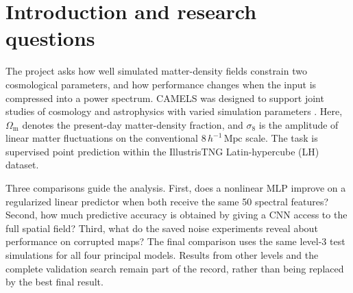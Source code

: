 \documentclass[11pt,a4paper]{article}
\newcommand{\Om}{\Omega_{\mathrm m}}
\newcommand{\sig}{\sigma_8}
\begin{document}
\begin{abstract}
We study supervised estimation of the matter-density parameter $\Om$ and fluctuation-amplitude parameter $\sig$ from CAMELS IllustrisTNG total-matter maps at redshift zero. The project compares Ridge regression and a multilayer perceptron (MLP) on 50-bin projected power spectra with convolutional neural networks (CNNs) on full $256\times256$ density maps. Simulation-level partitioning keeps each simulation's 15 related maps together across training, validation, and test groups. The three disjoint dataset levels contain 67, 333, and 600 simulations. Ridge and MLP tests show moderate gains over a training-mean baseline, with weak small-sample performance for $\sig$. On the level-3 held-out test set of 120 simulations and 1,800 maps, the 10-step CNN obtains map RMSE $(0.0211,0.0304)$ and the 16-step CNN obtains $(0.0192,0.0324)$ for $(\Om,\sig)$. Averaging predictions within each simulation improves these errors further, though the two CNNs retain different strengths. Saved Gaussian-noise experiments show larger group-average errors at noise strength 0.05 than at 0.01. Because those experiments use corrupted training and test inputs, different shortlisted models, and validation-selected checkpoints, they do not establish the benefit of training-time augmentation on clean data. Complete score tables, all saved figures, and a source manifest accompany this report.
\end{abstract}

\begingroup
\small\setlength{\parskip}{0pt}
\tableofcontents
\endgroup
\clearpage

\section{Introduction and research questions}
The project asks how well simulated matter-density fields constrain two cosmological parameters, and how performance changes when the input is compressed into a power spectrum. CAMELS was designed to support joint studies of cosmology and astrophysics with varied simulation parameters \cite{camels,cmd}. Here, $\Om$ denotes the present-day matter-density fraction, and $\sig$ is the amplitude of linear matter fluctuations on the conventional $8\,h^{-1}\,\mathrm{Mpc}$ scale. The task is supervised point prediction within the IllustrisTNG Latin-hypercube (LH) dataset.

Three comparisons guide the analysis. First, does a nonlinear MLP improve on a regularized linear predictor when both receive the same 50 spectral features? Second, how much predictive accuracy is obtained by giving a CNN access to the full spatial field? Third, what do the saved noise experiments reveal about performance on corrupted maps? The final comparison uses the same level-3 test simulations for all four principal models. Results from other levels and the complete validation search remain part of the record, rather than being replaced by the best final result.
\end{document}
